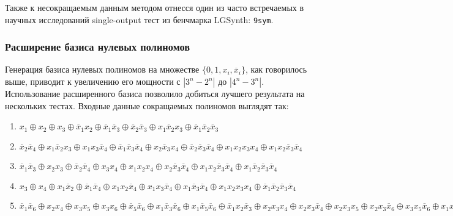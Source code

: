 \documentclass[a4paper,12pt,titlepage,finall]{article}
\begin{document}
Также к несокращаемым данным методом отнесся один из часто встречаемых в научных исследований single-output тест из бенчмарка LGSynth: \texttt{9sym}.

\subsubsection{Расширение базиса нулевых полиномов}

Генерация базиса нулевых полиномов на множестве $ \{ 0, 1, x_i, \overline x_i \} $, как говорилось выше, приводит к увеличению его мощности с $ \left| 3^n - 2^n \right| $ до $ \left| 4^n - 3^n \right| $. Использование расширенного базиса позволило добиться лучшего результата на нескольких тестах. Входные данные сокращаемых полиномов выглядят так:
\begin{enumerate}
    \item $ x_1 \oplus x_2 \oplus x_3 \oplus \overline x_1 x_2 \oplus \overline x_1 \overline x_3 \oplus \overline x_2 \overline x_3 \oplus x_1 \overline x_2 x_3 \oplus \overline x_1 \overline x_2 \overline x_3 $
    \item $ \overline x_2 \overline x_4 \oplus x_1 \overline x_2 x_3 \oplus x_1 x_3 \overline x_4 \oplus \overline x_1 \overline x_3 \overline x_4 \oplus x_2 \overline x_3 x_4 \oplus \overline x_2 \overline x_3 \overline x_4 \oplus x_1 x_2 x_3 x_4 \oplus x_1 x_2 \overline x_3 \overline x_4 $
    \item $ \overline x_1 \overline x_3 \oplus x_2 x_3 \oplus \overline x_2 \overline x_4 \oplus x_3 x_4 \oplus x_1 x_2 x_4 \oplus x_2 \overline x_3 \overline x_4 \oplus x_1 x_2 \overline x_3 \overline x_4 \oplus x_1 \overline x_2 \overline x_3 \overline x_4 $
    \item $ x_3 \oplus x_4 \oplus x_1 \overline x_2 \oplus \overline x_1 \overline x_4 \oplus x_1 x_2 \overline x_4 \oplus x_1 x_3 \overline x_4 \oplus x_1 \overline x_3 \overline x_4 \oplus x_1 x_2 x_3 x_4 \oplus \overline x_1 \overline x_2 \overline x_3 \overline x_4 $
    \item $ \overline x_1 \overline x_6 \oplus x_2 x_4 \oplus x_3 x_5 \oplus x_3 x_6 \oplus \overline x_5 \overline x_6 \oplus x_1 \overline x_3 \overline x_6 \oplus x_1 \overline x_5 \overline x_6 \oplus \overline x_1 x_2 \overline x_3 \oplus x_2 x_3 x_4 \oplus x_2 x_3 \overline x_4 \oplus x_2 x_3 x_5 \oplus x_2 x_3 \overline x_6 \oplus x_3 x_5 \overline x_6 \oplus x_1 x_3 x_5 \overline x_6 \oplus \overline x_1 \overline x_3 \overline x_5 \overline x_6 \oplus x_2 x_3 x_4 x_5 \oplus x_2 \overline x_3 \overline x_5 \overline x_6 \oplus x_1 \overline x_2 x_3 \overline x_4 x_5 \overline x_6 $
\end{enumerate}
\end{document}
